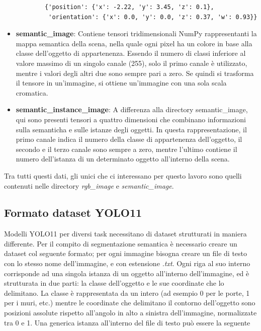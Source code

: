 \documentclass[12pt]{report}
\begin{document}
\begin{itemize}
	\begin{verbatim}
		{'position': {'x': -2.22, 'y': 3.45, 'z': 0.1},
		 'orientation': {'x': 0.0, 'y': 0.0, 'z': 0.37, 'w': 0.93}}
	\end{verbatim}
	
	\item \textbf{semantic\_image}: Contiene tensori tridimensionali NumPy rappresentanti la mappa semantica della scena, nella quale ogni pixel ha un colore in base alla classe dell'oggetto di appartenenza. Essendo il numero di classi inferiore al valore massimo di un singolo canale (255), solo il primo canale è utilizzato, mentre i valori degli altri due sono sempre pari a zero. Se quindi si trasforma il tensore in un'immagine, si ottiene un'immagine con una sola scala cromatica.
	
	\item \textbf{semantic\_instance\_image}: A differenza alla directory semantic\_image, qui sono presenti tensori a quattro dimensioni che combinano informazioni sulla semanticha e sulle istanze degli oggetti. In questa rappresentazione, il primo canale indica il numero della classe di appartenenza dell'oggetto, il secondo e il terzo canale sono sempre a zero, mentre l'ultimo contiene il numero dell'istanza di un determinato oggetto all'interno della scena.
\end{itemize}

Tra tutti questi dati, gli unici che ci interessano per questo lavoro sono quelli contenuti nelle directory \textit{rgb\_image} e \textit{semantic\_image}.

\subsection{Formato dataset YOLO11}
\label{chap:formato_dataset_yolo_per_segmentazione}

Modelli YOLO11 per diversi task necessitano di dataset strutturati in maniera differente. Per il compito di segmentazione semantica è necessario creare un dataset col seguente formato; per ogni immagine bisogna creare un file di testo con lo stesso nome dell'immagine, e con estensione \textit{.txt}. Ogni riga al suo interno corrisponde ad una singola istanza di un oggetto all'interno dell'immagine, ed è strutturata in due parti: la classe dell'oggetto e le sue coordinate che lo delimitano. La classe è rappresentata da un intero (ad esempio 0 per le porte, 1 per i muri, etc.) mentre le coordinate che delimitano il contorno dell'oggetto sono posizioni assolute rispetto all'angolo in alto a sinistra dell'immagine, normalizzate tra 0 e 1. Una generica istanza all'interno del file di testo può essere la seguente
\end{document}
